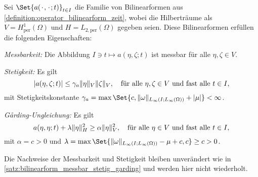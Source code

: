 \documentclass[../main.tex]{subfiles}
\begin{document}
\begin{Lemma}
\label{lemma:bilinearform_periodisch_messbar_stetig_garding}
    Sei $\Set{a(\blank, \blank; t)}_{t \in I}$ die Familie von Bilinearformen aus \cref{definition:operator_bilinearform_zeit}, wobei die Hilberträume als $V = H^{1}_{\text{per}}(\Omega)$ und $H = L_{2,\text{per}}(\Omega)$ gegeben seien.
    Diese Bilinearformen erfüllen die folgenden Eigenschaften:
    \begin{thmenumerate}
        \item \label{lemma:bilinearform_periodisch_messbar_stetig_garding:messbar}
        \emph{Messbarkeit:} Die Abbildung $I \ni t \mapsto a(\eta, \zeta; t)$ ist messbar für alle $\eta, \zeta \in V$.
        \item\label{lemma:bilinearform_periodisch_messbar_stetig_garding:stetig}
        \emph{Stetigkeit:} Es gilt
        \begin{equation}
            \label{eq:bilinearform_periodisch_messbar_stetig_garding:stetig}
            \abs{a(\eta, \zeta; t)} \leq \gamma_{a} \norm{\eta}_{V} \norm{\zeta}_{V}, \quad \fa \eta, \zeta \in V \text{ und fast alle } t \in I,
        \end{equation}
        mit Stetigkeitskonstante $\gamma_{a} = \max\Set{c, \norm{\omega}_{L_{\infty}(I; L_{\infty}(\Omega))} + \abs{\mu}} < \infty$.
        \item\label{lemma:bilinearform_periodisch_messbar_stetig_garding:garding}
        \emph{G\aa{}rding-Ungleichung:} Es gilt
        \begin{equation}
            \label{eq:bilinearform_periodisch_messbar_stetig_garding:garding}
            a(\eta, \eta; t) + \lambda \norm{\eta}_{H}^{2} \geq \alpha \norm{\eta}_{V}^{2}, \quad \fa \eta \in V \text{ und fast alle } t \in I,
        \end{equation}
        mit $\alpha = c > 0$ und $\lambda = \max\Set{\norm{\omega}_{L_{\infty}(I;L_{\infty}(\Omega))} - \mu + c, c} \geq c > 0$.
    \end{thmenumerate}

    \begin{Beweis}
        Die Nachweise der Messbarkeit und Stetigkeit bleiben unverändert wie in \cref{satz:bilinearform_messbar_stetig_garding} und werden hier nicht wiederholt.


\end{Beweis}
\end{Lemma}
\end{document}
